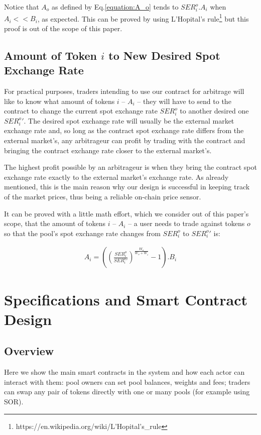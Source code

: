 \documentclass[11pt]{amsart}
\begin{document}
Notice that $A_{o}$ as defined by Eq.\ref{equation:A_o} tends to $SER^{o}_{i}.A_{i}$ when $A_{i} << B_{i}$, as expected. This can be proved by using L'Hopital's rule\footnote{https://en.wikipedia.org/wiki/L'Hopital's\_rule} but this proof is out of the scope of this paper.

\subsection{Amount of Token $i$ to New Desired Spot Exchange Rate}
For practical purposes, traders intending to use our contract for arbitrage will like to know what amount of tokens $i$ -- $A_{i}$ -- they will have to send to the contract to change the current spot exchange rate $SER^{o}_{i}$ to another desired one $SER^{o}_{i}'$. The desired spot exchange rate will usually be the external market exchange rate and, so long as the contract spot exchange rate differs from the external market's, any arbitrageur can profit by trading with the contract and bringing the contract exchange rate closer to the external market's.

The highest profit possible by an arbitrageur is when they bring the contract spot exchange rate exactly to the external market's exchange rate. As already mentioned, this is the main reason why our design is successful in keeping track of the market prices, thus being a reliable on-chain price sensor.

It can be proved with a little math effort, which we consider out of this paper's scope, that the amount of tokens $i$ -- $A_{i}$ -- a user needs to trade against tokens $o$ so that the pool's spot exchange rate changes from $SER^{o}_{i}$ to $SER^{o}_{i}'$ is:

\begin{equation}
\begin{gathered}
A_{i} = \left(\left(\frac{SER^{o}_{i}}{SER^{o}_{i}'}\right)^\frac{W_{o}}{W_{o}+W_{i}} - 1 \right).B_{i}
\end{gathered}
\end{equation}

\section{Specifications and Smart Contract Design}

\subsection{Overview}
Here we show the main smart contracts in the system and how each actor can interact with them: pool owners can set pool balances, weights and fees; traders can swap any pair of tokens directly with one or many pools (for example using SOR).
\end{document}
